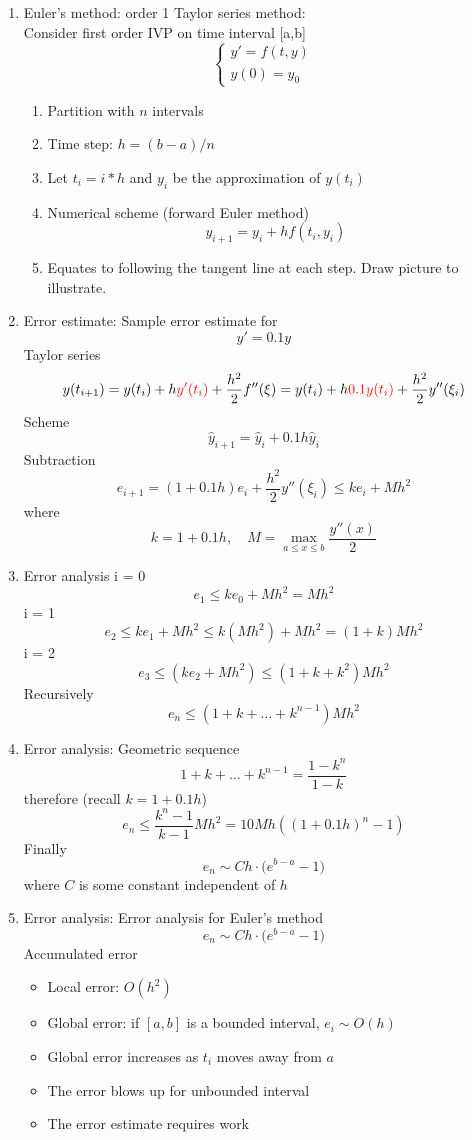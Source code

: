\documentclass{article}
\theoremstyle{remark}
\begin{document}
\begin{enumerate}
\item Euler's method: order 1 Taylor series method:  \\
Consider first order IVP on time interval [a,b]
$$
\left\{\begin{array}{l}
y' = f(t,y)\\
y(0) = y_0
\end{array}\right.
$$
\begin{enumerate}
\item Partition with $n$ intervals
\item Time step: $h = (b-a)/n$
\item Let $t_i = i*h$ and  $y_i$ be the approximation of $y(t_i)$
\item Numerical scheme (forward Euler method)
$$
y_{i+1} = y_i + hf(t_i, y_i)
$$
\item Equates to following the tangent line at each step. Draw picture to illustrate.
\end{enumerate}

\item Error estimate: 
Sample error estimate for 
$$
y' = 0.1y
$$
Taylor series
$$
y(t_{i+1}) = y(t_i) + h{\color{red} y'(t_i)} +\frac{h^2}{2}f''(\xi) = y(t_i) + h{\color{red} 0.1y(t_i)}+\frac{h^2}{2}y''(\xi_i)
$$ 
Scheme
$$
\hat{y}_{i+1} = \hat{y}_i+ 0.1h\hat{y}_i
$$
Subtraction
$$
e_{i+1} =(1+0.1h) e_i +\frac{h^2}{2}y''(\xi_i) \leq k e_i +Mh^2
$$
where
$$
k = 1+0.1h,\quad M = \max_{a\leq x\leq b}\frac{y''(x)}{2}
$$

\item Error analysis
 i = 0
$$
e_{1} \leq  k e_0 +Mh^2 = Mh^2
$$
i = 1
$$
e_2 \leq k e_1 +Mh^2 \leq k( Mh^2) +Mh^2 = (1+k)Mh^2
$$
i = 2
$$
e_3 \leq (k e_2 +Mh^2) \leq (1+k+k^2)Mh^2
$$
Recursively
$$
e_n \leq (1+k+\dots+k^{n-1})Mh^2
$$

\item Error analysis: Geometric sequence
$$
1+k+\dots+k^{n-1} = \frac{1-k^n}{1-k}
$$
therefore (recall $k = 1+0.1h$)
$$
e_n \leq\frac{k^n-1}{k-1}Mh^2 = 10Mh((1+0.1h)^n-1)
$$
Finally
$$
e_n \sim Ch\cdot\Big(e^{b-a}-1\Big)
$$
where $C$ is some constant independent of $h$

\item Error analysis: 
Error analysis for Euler's method
$$
e_n \sim Ch\cdot\Big(e^{b-a}-1\Big)
$$
Accumulated error
\begin{itemize}
\item Local error: $O(h^2)$
\item Global error: if $[a,b]$ is a bounded interval, $e_i\sim O(h)$
\item Global error increases as $t_i$ moves away from $a$
\item The error blows up for unbounded interval
\item The error estimate requires work
\end{itemize}


\end{enumerate}
\end{document}
